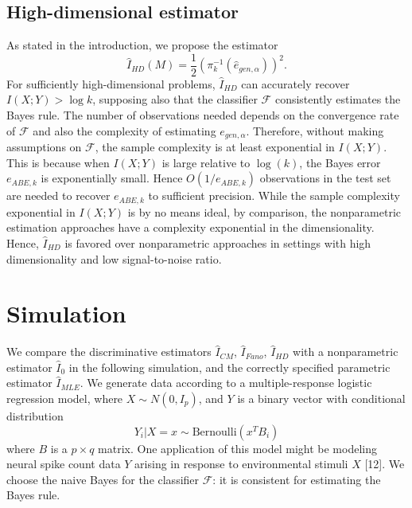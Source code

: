 \documentclass{article}
\begin{document}
\subsection{High-dimensional estimator}

As stated in the introduction, we propose the estimator
\[
\hat{I}_{HD}(M) = \frac{1}{2}(\pi_{k}^{-1}(\hat{e}_{gen, \alpha}))^2.
\]
For sufficiently high-dimensional problems, $\hat{I}_{HD}$ can
accurately recover $I(X; Y) > \log k$, supposing also that the
classifier $\mathcal{F}$ consistently estimates the Bayes rule.  The
number of observations needed depends on the convergence rate of
$\mathcal{F}$ and also the complexity of estimating $e_{gen, \alpha}$.
Therefore, without making assumptions on $\mathcal{F}$, the sample
complexity is at least exponential in $I(X; Y)$.  This is because when
$I(X; Y)$ is large relative to $\log(k)$, the Bayes error $e_{ABE, k}$
is exponentially small.  Hence $O(1/e_{ABE, k})$ observations in the
test set are needed to recover $e_{ABE, k}$ to sufficient precision.
While the sample complexity exponential in $I(X; Y)$ is by no means
ideal, by comparison, the nonparametric estimation approaches have a
complexity exponential in the dimensionality.  Hence, $\hat{I}_{HD}$
is favored over nonparametric approaches in settings with high
dimensionality and low signal-to-noise ratio.


\section{Simulation}

We compare the discriminative estimators $\hat{I}_{CM}$,
$\hat{I}_{Fano}$, $\hat{I}_{HD}$ with a nonparametric estimator
$\hat{I}_0$ in the following simulation, and the correctly specified parametric estimator $\hat{I}_{MLE}$.  We generate data according
to a multiple-response logistic regression model, where $ X \sim N(0,
I_p) $, and $Y$ is a binary vector with conditional distribution
\[
Y_i|X = x \sim \text{Bernoulli}(x^T B_i)
\]
where $B$ is a $p \times q$ matrix.  One application of this model
might be modeling neural spike count data $Y$ arising in response to
environmental stimuli $X$ [12].  We choose the naive Bayes for the
classifier $\mathcal{F}$: it is consistent for estimating the Bayes
rule. 
\end{document}
